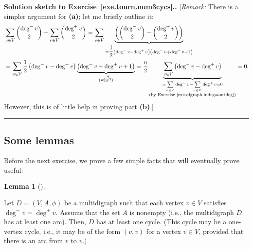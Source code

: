 \documentclass[numbers=enddot,12pt,final,onecolumn,notitlepage]{scrartcl}%
\newcounter{exer}
\theoremstyle{definition}
\newtheorem{lem}[theo]{Lemma}
\newenvironment{lemma}[1][]
{\begin{lem}[#1]\begin{leftbar}}
{\end{leftbar}\end{lem}}
\newenvironment{proof}[1][Proof]{\noindent\textbf{#1.} }{\ \rule{0.5em}{0.5em}}
\let\sumnonlimits\sum
\renewcommand{\sum}{\sumnonlimits\limits}
\newcommand{\tup}[1]{\left( #1 \right)}
\newcommand{\underbrack}[2]{\underbrace{#1}_{\substack{#2}}}
\begin{document}
\begin{proof}[Solution sketch to Exercise~\ref{exe.tourn.num3cycs}.]
[\textit{Remark:} There is a simpler argument for \textbf{(a)}; let me
briefly outline it:
\begin{align*}
& \sum_{v \in V} \dbinom{\deg^- v}{2}
  - \sum_{v \in V} \dbinom{\deg^+ v}{2}
= \sum_{v \in V}
    \underbrack{\tup{\dbinom{\deg^- v}{2} - \dbinom{\deg^+ v}{2}}
               }{= \dfrac{1}{2} \tup{\deg^- v - \deg^+ v}
                   \tup{\deg^- v + \deg^+ v + 1}} \\
&= \sum_{v \in V}
    \dfrac{1}{2} \tup{\deg^- v - \deg^+ v}
    \underbrack{\tup{\deg^- v + \deg^+ v + 1}}{= n \\ \text{(why?)}}
= \dfrac{n}{2}
    \underbrack{\sum_{v \in V} \tup{\deg^- v - \deg^+ v}
               }{= \sum_{v \in V} \deg^- v - \sum_{v \in V} \deg^+ v
                 = 0 \\
                 \text{(by Exercise~\ref{exe.digraph.indeg=outdeg})}}
= 0.
\end{align*}
However, this is of little help in proving part \textbf{(b)}.]
\end{proof}

\subsection{Some lemmas}

Before the next exercise, we prove a few simple facts that will
eventually prove useful:

\begin{lemma} \label{lem.digraph.balanced-cycle}
Let $D = \tup{V, A, \phi}$ be a multidigraph such that each vertex
$v \in V$ satisfies $\deg^- v = \deg^+ v$. Assume that the set $A$ is
nonempty (i.e., the multidigraph $D$ has at least one arc). Then, $D$
has at least one cycle. (This cycle may be a one-vertex cycle, i.e.,
it may be of the form $\tup{v, v}$ for a vertex $v \in V$, provided
that there is an arc from $v$ to $v$.)
\end{lemma}
\end{document}
